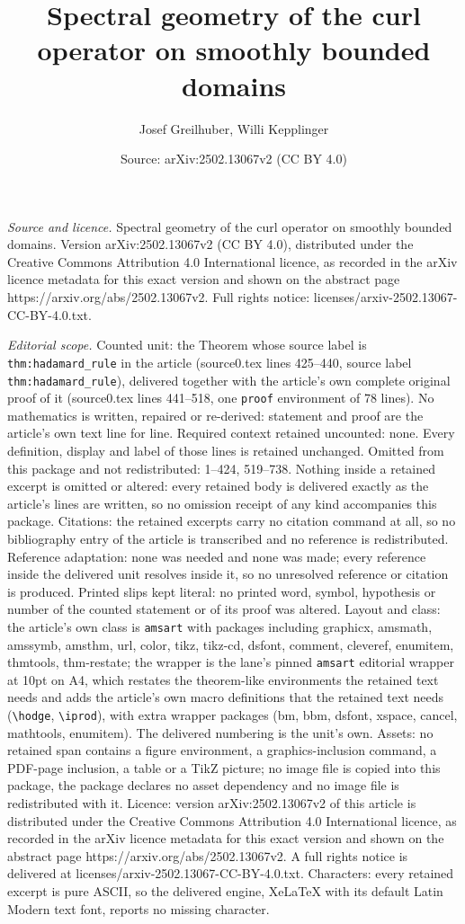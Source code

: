 \documentclass[10pt,a4paper]{amsart}
\title[Spectral geometry of the curl operator on smoothly bounded d]{Spectral geometry of the curl operator on smoothly bounded domains}
\author{Josef Greilhuber, Willi Kepplinger}
\date{Source: arXiv:2502.13067v2 (CC BY 4.0)}
\begin{document}
\maketitle

\noindent\emph{Source and licence.} Spectral geometry of the curl operator on smoothly bounded domains. Version arXiv:2502.13067v2 (CC BY 4.0), distributed under the Creative Commons Attribution 4.0 International licence, as recorded in the arXiv licence metadata for this exact version and shown on the abstract page https://arxiv.org/abs/2502.13067v2. Full rights notice: licenses/arxiv-2502.13067-CC-BY-4.0.txt.\par\smallskip

\noindent\textit{Editorial scope.} Counted unit: the Theorem whose source label is \texttt{thm:hadamard\_rule} in the article (source0.tex lines 425--440, source label \texttt{thm:hadamard\_rule}), delivered together with the article's own complete original proof of it (source0.tex lines 441--518, one \texttt{proof} environment of 78 lines). No mathematics is written, repaired or re-derived: statement and proof are the article's own text line for line. Required context retained uncounted: none. Every definition, display and label of those lines is retained unchanged. Omitted from this package and not redistributed: 1--424, 519--738. Nothing inside a retained excerpt is omitted or altered: every retained body is delivered exactly as the article's lines are written, so no omission receipt of any kind accompanies this package. Citations: the retained excerpts carry no citation command at all, so no bibliography entry of the article is transcribed and no reference is redistributed. Reference adaptation: none was needed and none was made; every reference inside the delivered unit resolves inside it, so no unresolved reference or citation is produced. Printed slips kept literal: no printed word, symbol, hypothesis or number of the counted statement or of its proof was altered. Layout and class: the article's own class is \texttt{amsart} with packages including graphicx, amsmath, amssymb, amsthm, url, color, tikz, tikz-cd, dsfont, comment, cleveref, enumitem, thmtools, thm-restate; the wrapper is the lane's pinned \texttt{amsart} editorial wrapper at 10pt on A4, which restates the theorem-like environments the retained text needs and adds the article's own macro definitions that the retained text needs (\texttt{\textbackslash hodge}, \texttt{\textbackslash iprod}), with extra wrapper packages (bm, bbm, dsfont, xspace, cancel, mathtools, enumitem). The delivered numbering is the unit's own. Assets: no retained span contains a figure environment, a graphics-inclusion command, a PDF-page inclusion, a table or a TikZ picture; no image file is copied into this package, the package declares no asset dependency and no image file is redistributed with it. Licence: version arXiv:2502.13067v2 of this article is distributed under the Creative Commons Attribution 4.0 International licence, as recorded in the arXiv licence metadata for this exact version and shown on the abstract page https://arxiv.org/abs/2502.13067v2. A full rights notice is delivered at licenses/arxiv-2502.13067-CC-BY-4.0.txt. Characters: every retained excerpt is pure ASCII, so the delivered engine, XeLaTeX with its default Latin Modern text font, reports no missing character.
\end{document}
